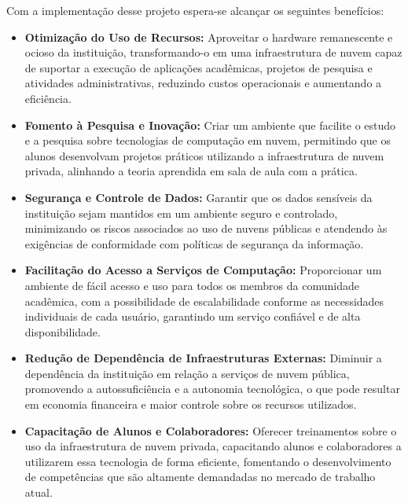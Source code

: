 Com a implementação desse projeto espera-se alcançar os seguintes benefícios:

\begin{itemize}
    \item \textbf{Otimização do Uso de Recursos:} Aproveitar o hardware remanescente e ocioso da instituição, transformando-o em uma infraestrutura de nuvem capaz de suportar a execução de aplicações acadêmicas, projetos de pesquisa e atividades administrativas, reduzindo custos operacionais e aumentando a eficiência.

    \item \textbf{Fomento à Pesquisa e Inovação:} Criar um ambiente que facilite o estudo e a pesquisa sobre tecnologias de computação em nuvem, permitindo que os alunos desenvolvam projetos práticos utilizando a infraestrutura de nuvem privada, alinhando a teoria aprendida em sala de aula com a prática.

    \item \textbf{Segurança e Controle de Dados:} Garantir que os dados sensíveis da instituição sejam mantidos em um ambiente seguro e controlado, minimizando os riscos associados ao uso de nuvens públicas e atendendo às exigências de conformidade com políticas de segurança da informação.

    \item \textbf{Facilitação do Acesso a Serviços de Computação:} Proporcionar um ambiente de fácil acesso e uso para todos os membros da comunidade acadêmica, com a possibilidade de escalabilidade conforme as necessidades individuais de cada usuário, garantindo um serviço confiável e de alta disponibilidade.

    \item \textbf{Redução de Dependência de Infraestruturas Externas:} Diminuir a dependência da instituição em relação a serviços de nuvem pública, promovendo a autossuficiência e a autonomia tecnológica, o que pode resultar em economia financeira e maior controle sobre os recursos utilizados.

    \item \textbf{Capacitação de Alunos e Colaboradores:} Oferecer treinamentos sobre o uso da infraestrutura de nuvem privada, capacitando alunos e colaboradores a utilizarem essa tecnologia de forma eficiente, fomentando o desenvolvimento de competências que são altamente demandadas no mercado de trabalho atual.
\end{itemize}

